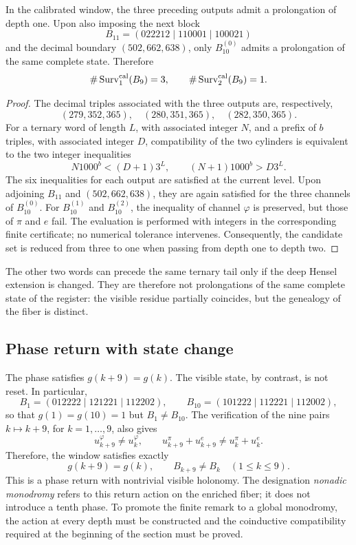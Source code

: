\begin{theorem}
\label{thm:seleccion-novena-fase}
In the calibrated window, the three preceding outputs admit a prolongation
of depth one. Upon also imposing the next block
\[
B_{11}=(022212\mid110001\mid100021)
\]
and the decimal boundary \((502,662,638)\), only \(B_{10}^{(0)}\) admits a
prolongation of the same complete state. Therefore
\[
\#\operatorname{Surv}^{\rm cal}_{1}(B_9)=3,
\qquad
\#\operatorname{Surv}^{\rm cal}_{2}(B_9)=1.
\]
\end{theorem}

\begin{proof}
The decimal triples associated with the three outputs are, respectively,
\[
(279,352,365),\quad(280,351,365),\quad(282,350,365).
\]
For a ternary word of length \(L\), with associated integer \(N\), and a
prefix of \(b\) triples, with associated integer \(D\), compatibility of the
two cylinders is equivalent to the two integer inequalities
\[
N1000^b<(D+1)3^L,
\qquad
(N+1)1000^b>D3^L.
\]
The six inequalities for each output are satisfied at the current level. Upon
adjoining \(B_{11}\) and \((502,662,638)\), they are again satisfied for the three
channels of \(B_{10}^{(0)}\). For \(B_{10}^{(1)}\) and \(B_{10}^{(2)}\), the
inequality of channel \(\varphi\) is preserved, but those of \(\pi\) and
\(e\) fail. The evaluation is performed with integers in the corresponding finite certificate; no
numerical tolerance intervenes. Consequently, the candidate set
is reduced from three to one when passing from depth one to depth two.
\end{proof}

The other two words can precede the same ternary tail only if the
deep Hensel extension is changed. They are therefore not prolongations of
the same complete state of the register: the visible residue partially coincides, but
the genealogy of the fiber is distinct.

\subsection{Phase return with state change}

The phase satisfies \(g(k+9)=g(k)\). The visible state, by contrast, is not
reset. In particular,
\[
B_1=(012222\mid121221\mid112202),
\qquad
B_{10}=(101222\mid112221\mid112002),
\]
so that \(g(1)=g(10)=1\) but \(B_1\ne B_{10}\). The verification of the
nine pairs \(k\mapsto k+9\), for \(k=1,\ldots,9\), also gives
\[
u_{k+9}^\varphi\ne u_k^\varphi,
\qquad
u_{k+9}^\pi+u_{k+9}^e\ne u_k^\pi+u_k^e.
\]
Therefore, the window satisfies exactly
\[
\boxed{g(k+9)=g(k),\qquad B_{k+9}\ne B_k
\quad(1\le k\le9).}
\]
This is a phase return with nontrivial visible holonomy. The designation
\emph{nonadic monodromy} refers to this return action on the
enriched fiber; it does not introduce a tenth phase. To promote the finite remark
to a global monodromy, the action at every depth must be constructed
and the coinductive compatibility required at the beginning of the section must be proved.

